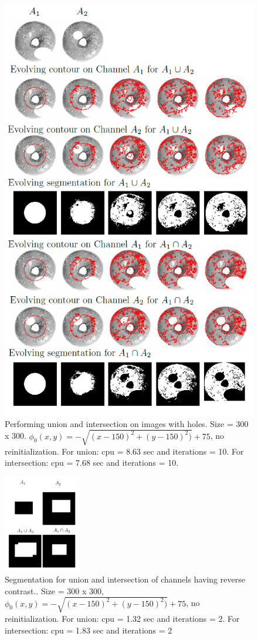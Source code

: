 \documentclass[10pt,twocolumn,letterpaper]{article}
\begin{document}
\begin{figure}[t!]
\centering
\includegraphics[width=12cm]{donutlogic.png}
\caption{Performing union and intersection on images with holes. Size = 300 x 300. $\phi_{0}(x,y) = - \sqrt{(x - 150)^2 + (y - 150)^2)} +
75$, no reinitialization. For union: cpu = 8.63 sec and iterations = 10. For intersection: cpu = 7.68 sec and iterations = 10.}
\label{fig:donutlogic}
\end{figure}

\begin{figure}[t!h!]
\centering
\includegraphics[width=0.3\textwidth]{diffint.png}
\caption{Segmentation for union and intersection of channels having reverse contrast.. Size = 300 x 300, $\phi_{0}(x,y) = - \sqrt{(x - 150)^2 + (y - 150)^2)} +
75$,  no reinitialization. For union: cpu = 1.32 sec and iterations = 2. For intersection: cpu = 1.83 sec and iterations = 2}
\label{fig:diffint}
\end{figure}
\end{document}
